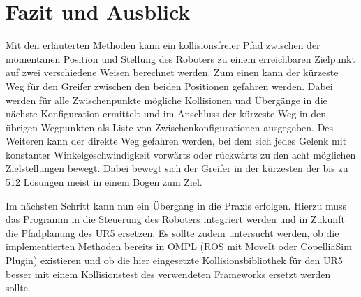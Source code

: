 \cleardoublepage
\chapter{Fazit und Ausblick}

Mit den erläuterten Methoden kann ein kollisionsfreier Pfad zwischen der momentanen Position und Stellung des Roboters zu einem erreichbaren Zielpunkt auf zwei verschiedene Weisen berechnet werden.
Zum einen kann der kürzeste Weg für den Greifer zwischen den beiden Positionen gefahren werden.
Dabei werden für alle Zwischenpunkte mögliche Kollisionen und Übergänge in die nächste Konfiguration ermittelt und im Anschluss der kürzeste Weg in den übrigen Wegpunkten als Liste von Zwischenkonfigurationen ausgegeben.
Des Weiteren kann der direkte Weg gefahren werden, bei dem sich jedes Gelenk mit konstanter Winkelgeschwindigkeit vorwärts oder rückwärts zu den acht möglichen Zielstellungen bewegt.
Dabei bewegt sich der Greifer in der kürzesten der bis zu 512 Lösungen meist in einem Bogen zum Ziel.

Im nächsten Schritt kann nun ein Übergang in die Praxis erfolgen.
Hierzu muss das Programm in die Steuerung des Roboters integriert werden und in Zukunft die Pfadplanung des UR5 ersetzen.
Es sollte zudem untersucht werden, ob die implementierten Methoden bereits in OMPL (ROS mit MoveIt oder CopelliaSim Plugin) existieren und ob die hier eingesetzte Kollisionsbibliothek für den UR5 besser mit einem Kollisionstest des verwendeten Frameworks ersetzt werden sollte.